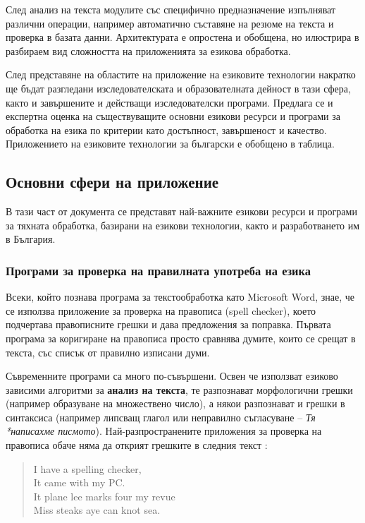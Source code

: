 \begin{multicols}{2}
  След анализ на текста модулите със специфично предназначение изпълняват различни операции, например автоматично съставяне на резюме на текста и проверка в базата данни. Архитектурата е опростена и обобщена, но илюстрира в разбираем вид сложността на приложенията за езикова обработка. 

  След представяне на областите на приложение на езиковите технологии накратко ще бъдат разгледани изследователската и образователната дейност в тази сфера, както и завършените и действащи изследователски програми. Предлага се  и експертна оценка на съществуващите основни езикови ресурси и програми за обработка на езика по критерии като достъпност, завършеност и качество. Приложението на езиковите технологии за български е обобщено в таблица.

  \subsection{Основни сфери на приложение}

  В тази част от документа се представят най-важните езикови ресурси и програми за тяхната обработка, базирани на езикови технологии, както и разработването им в България. 

  \subsubsection{Програми за проверка на правилната употреба на езика}

  Всеки, който познава програма за текстообработка като Microsoft Word, знае, че се използва приложение за проверка на правописа (spell checker), което подчертава правописните грешки и дава предложения за поправка. Първата програма за коригиране на правописа просто сравнява думите, които се срещат в текста, със списък от правилно изписани думи. 

  Съвременните програми са много по-съвършени. Освен че използват
  езиково зависими алгоритми за \textbf{анализ на текста}, те разпознават
  морфологични грешки (например образуване на множествено число), а
  някои разпознават и грешки в синтаксиса (например липсващ глагол или
  неправилно съгласуване -- {\it Тя *написахме
    писмото}). Най-разпространените приложения за проверка на правописа
  обаче няма да открият грешките в следния текст \cite{zar1}: 

  \begin{quote}
    I have a spelling checker,\\
    It came with my PC.\\
    It plane lee marks four my revue\\
    Miss steaks aye can knot sea.
  \end{quote}


\end{multicols}
